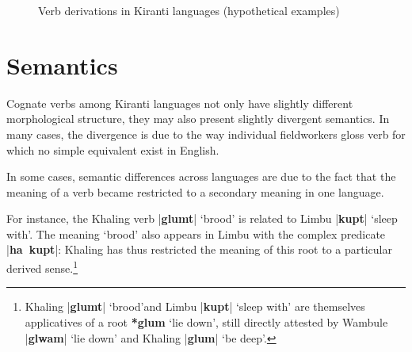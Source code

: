 \documentclass[oneside,a4paper,11pt]{article}
\newcommand{\ipa}[1]{\textbf{{\phon\mbox{#1}}}} %
\newcommand{\dhatu}[2]{|\ipa{#1}| `#2'}
\newcommand{\dhat}[1]{|\ipa{#1}|}
\begin{document}
   \begin{figure}[H]
   \caption{Verb derivations in Kiranti languages (hypothetical examples)} \label{fig:kiranti.derivations}  
\end{figure}

\section{Semantics} \label{sec:semantic}
Cognate verbs among Kiranti languages not only have slightly different morphological structure, they may also present slightly divergent semantics. In many cases, the divergence is due to the way individual fieldworkers gloss verb for which no simple equivalent exist in English.

In some cases, semantic differences across languages are due to the fact that the meaning of a verb became restricted to a secondary meaning in one language. 

For instance, the Khaling verb \dhatu{glumt}{brood} is related to Limbu \dhatu{kupt}{sleep with}. The meaning `brood' also appears in Limbu with the complex predicate \dhat{ha kupt}: Khaling has thus restricted the meaning of this root to a particular derived sense.\footnote{Khaling \dhatu{glumt}{brood}and Limbu  \dhatu{kupt}{sleep with} are themselves applicatives of a root \ipa{*glum} `lie down', still directly attested by Wambule  \dhatu{glwam}{lie down} and Khaling \dhatu{glum}{be deep}.  }
\end{document}
